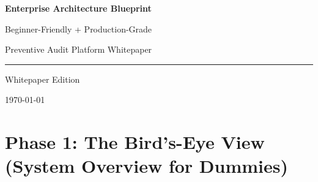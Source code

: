 \documentclass[11pt,a4paper]{article}
\begin{document}
\begin{titlepage}
  \centering
  \vspace*{2.8cm}

  {\Huge\bfseries\color{PrimaryNavy} Enterprise Architecture Blueprint\par}
  \vspace{0.55cm}
  {\Large\color{AccentBlue} Beginner-Friendly + Production-Grade\par}
  \vspace{0.2cm}
  {\Large\color{AccentBlue} Preventive Audit Platform Whitepaper\par}

  \vspace{1.2cm}
  {\color{MutedGray}\rule{0.78\textwidth}{0.6pt}\par}

  \vfill
  {\large\color{BodyGray}Whitepaper Edition\par}
  \vspace{0.35cm}
  {\large\color{BodyGray}\today\par}

  \vspace*{1.5cm}
\end{titlepage}

\tableofcontents
\newpage

\section{Phase 1: The Bird's-Eye View (System Overview for Dummies)}
\end{document}
